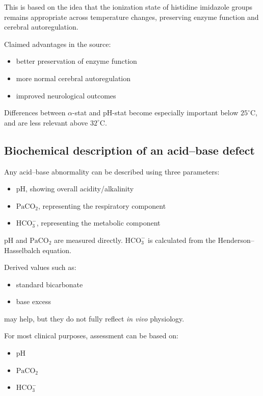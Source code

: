 \documentclass[11pt,a4paper]{article}
\begin{document}
This is based on the idea that the ionization state of histidine imidazole groups remains appropriate across temperature changes, preserving enzyme function and cerebral autoregulation.

Claimed advantages in the source:
\begin{itemize}
  \item better preservation of enzyme function
  \item more normal cerebral autoregulation
  \item improved neurological outcomes
\end{itemize}

Differences between \(\alpha\)-stat and pH-stat become especially important below \(25^\circ\mathrm{C}\), and are less relevant above \(32^\circ\mathrm{C}\).

\subsection{Biochemical description of an acid--base defect}

Any acid--base abnormality can be described using three parameters:
\begin{itemize}
  \item pH, showing overall acidity/alkalinity
  \item \(\mathrm{PaCO_2}\), representing the respiratory component
  \item \(\mathrm{HCO_3^-}\), representing the metabolic component
\end{itemize}

pH and \(\mathrm{PaCO_2}\) are measured directly. \(\mathrm{HCO_3^-}\) is calculated from the Henderson--Hasselbalch equation.

Derived values such as:
\begin{itemize}
  \item standard bicarbonate
  \item base excess
\end{itemize}

may help, but they do not fully reflect \emph{in vivo} physiology.

For most clinical purposes, assessment can be based on:
\begin{itemize}
  \item pH
  \item \(\mathrm{PaCO_2}\)
  \item \(\mathrm{HCO_3^-}\)
\end{itemize}
\end{document}
